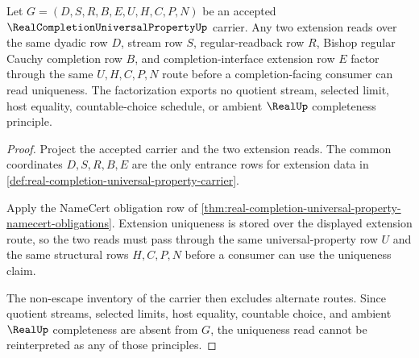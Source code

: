 \begin{theorem}
\label{thm:real-completion-universal-property-extension-uniqueness-factorization}
Let $G=(D,S,R,B,E,U,H,C,P,N)$ be an accepted $\RealCompletionUniversalPropertyUp$ carrier. Any two extension reads over the same dyadic row $D$, stream row $S$, regular-readback row $R$, Bishop regular Cauchy completion row $B$, and completion-interface extension row $E$ factor through the same $U,H,C,P,N$ route before a completion-facing consumer can read uniqueness. The factorization exports no quotient stream, selected limit, host equality, countable-choice schedule, or ambient $\RealUp$ completeness principle.
\end{theorem}
\begin{proof}
Project the accepted carrier and the two extension reads. The common coordinates $D,S,R,B,E$ are the only entrance rows for extension data in \autoref{def:real-completion-universal-property-carrier}.

Apply the NameCert obligation row of \autoref{thm:real-completion-universal-property-namecert-obligations}. Extension uniqueness is stored over the displayed extension route, so the two reads must pass through the same universal-property row $U$ and the same structural rows $H,C,P,N$ before a consumer can use the uniqueness claim.

The non-escape inventory of the carrier then excludes alternate routes. Since quotient streams, selected limits, host equality, countable choice, and ambient $\RealUp$ completeness are absent from $G$, the uniqueness read cannot be reinterpreted as any of those principles.
\end{proof}

